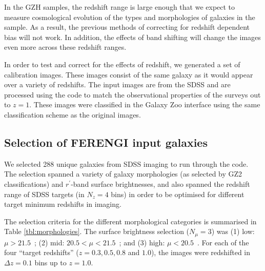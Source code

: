 \documentclass[usenatbib]{mn2e}
\begin{document}
In the GZH samples, the redshift range is large enough that we expect to measure cosmological evolution of the types and morphologies of galaxies in the sample. As a result, the previous methods of correcting for redshift dependent bias will not work. In addition, the effects of band shifting will change the images even more across these redshift ranges. %

In order to test and correct for the effects of redshift, we generated a set of calibration images. These images consist of the same galaxy as it would appear over a variety of redshifts. The input images are from the SDSS \citep{yor00,str02} and are processed using the \ferengi{} code \citep{bar08a} to match the observational properties of the \hst{} surveys out to $z=1$. These images were classified in the Galaxy Zoo interface using the same classification scheme as the original \hst{} images.
 
\subsection{Selection of FERENGI input galaxies}

We selected 288 unique galaxies from SDSS imaging to run through the \ferengi{} code. The selection spanned a variety of galaxy morphologies (as selected by GZ2 classifications) and $r^\prime$-band surface brightnesses, and also spanned the redshift range of SDSS targets (in $N_z = 4$ bins) in order to be optimised for different target minimum redshifts in \hst{} imaging. 

The selection criteria for the different morphological categories is summarised in Table \ref{tbl:morphologies}. The surface brightness selection ($N_\mu = 3$) was (1) low: $\mu > 21.5$~\magarc;  (2) mid: $20.5 < \mu < 21.5$~\magarc; and (3) high: $\mu < 20.5$~\magarc. For each of the four ``target redshifts'' ($z = 0.3, 0.5, 0.8$ and $1.0$), the images were redshifted in $\Delta z = 0.1$ bins up to $z=1.0$. 
 
\end{document}
